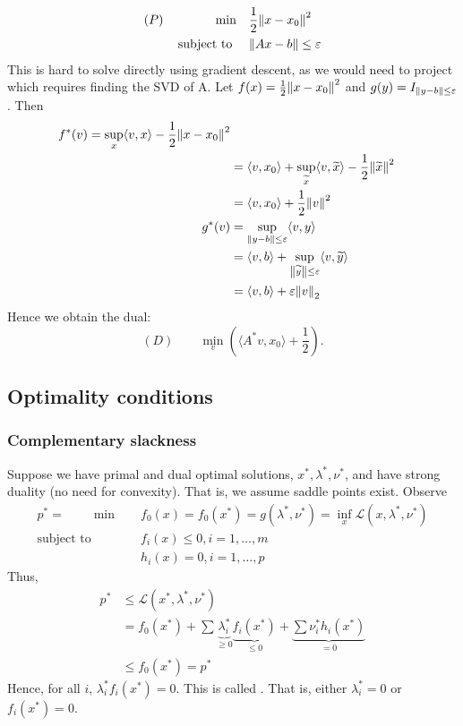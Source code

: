 \documentclass[class=article,crop=false]{standalone}
\begin{document}
\begin{eg}
\begin{align*}
	(P) \qquad \qquad \min\quad & \frac{1}{2} {\left\lVert{ x-x_0}\right\rVert}^2  \\
\text{subject to } \quad &{\left\lVert{ Ax-b}\right\rVert}\leq \varepsilon  
\end{align*}
This is hard to solve directly using gradient descent, as we would need to project which requires finding the SVD of A.
Let $ f(x) = \frac{1}{2} {\left\lVert{ x-x_0}\right\rVert}^2 $ and $ g(y) = I_{{\left\lVert{ y-b}\right\rVert}\leq \varepsilon }$. Then
\begin{align*}
	f^* (v) = \sup_x \langle v,x \rangle-\frac{1}{2}{\left\lVert{ x-x_0}\right\rVert} ^2\\
	&= \langle v,x_0 \rangle+ \sup_{\widetilde{ x}} \langle v,\widetilde{ x} \rangle -\frac{1}{2} {\left\lVert{ \widetilde{ x}}\right\rVert}^2  \\
	&= \langle v,x_0 \rangle + \frac{1}{2} {\left\lVert{ v}\right\rVert}^2  \\
	g^* (v) &= \sup_{{\left\lVert{ y-b}\right\rVert}\leq \varepsilon } \langle v,y \rangle \\
	&= \langle v,b \rangle+ \sup_{ {\left\lVert{ \widetilde{ y}}\right\rVert}\leq \varepsilon } \langle v,\widetilde{ y} \rangle \\
	&= \langle v,b \rangle + \varepsilon {\left\lVert{ v}\right\rVert}_2  
\end{align*}
Hence we obtain the dual:
\[
	(D) \qquad \min_v \left( \langle A^* v,x_0 \rangle + \frac{1}{2}  \right) 
.\] 
\end{eg}

\subsection{Optimality conditions}
\subsubsection{Complementary slackness}
Suppose we have primal and dual optimal solutions, $ x^* ,\lambda^* ,\nu^* $, and have strong duality (no need for convexity). That is, we assume saddle points exist. Observe
\begin{align*}
	p^* =\qquad \min\quad &f_0(x) = f_0(x^* ) = g(\lambda^* ,\nu^* ) = \inf_x \mathscr{L}(x,\lambda^* ,\nu^* )\\
\text{subject to } \quad &f_i(x) \leq 0, i = 1,\ldots,m \\
&h_i(x) = 0 , i = 1,\ldots,p
\end{align*}
Thus,
\begin{align*}
	p^* &\leq \mathscr{L}(x^* ,\lambda^* ,\nu^* )\\
	    &= f_0(x^* )+ \sum \underbrace{ \lambda_i^*}_{\geq 0} \underbrace{f_i(x^* )}_{\leq 0} + \underbrace{ \sum \nu_i^* h_i(x^* )}_{=0} \\
	    &\leq f_0 (x^* ) = p^*   
\end{align*}
Hence, for all $ i$,  $ \lambda_i^* f_i(x^* ) = 0$. This is called . That is, either $ \lambda_i^* =0$ or $ f_i(x^* ) = 0$.
\end{document}
